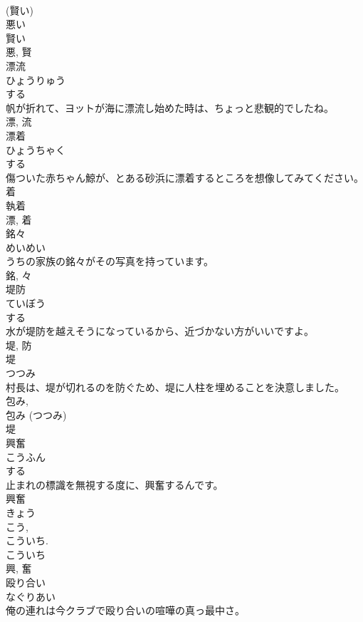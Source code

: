 \documentclass[8pt]{extreport}
\begin{document}
\begin{CJK}{UTF8}{min}
\\	(賢い) 
\\	悪い 
\\	賢い 
\\	悪, 賢	
\\	漂流	
\\	ひょうりゅう	
\\	する 
\\	帆が折れて、ヨットが海に漂流し始めた時は、ちょっと悲観的でしたね。	
\\	漂, 流	
\\	漂着	
\\	ひょうちゃく	
\\	する 
\\	傷ついた赤ちゃん鯨が、とある砂浜に漂着するところを想像してみてください。	
\\	着 
\\	執着 
\\	漂, 着	
\\	銘々	
\\	めいめい	
\\	うちの家族の銘々がその写真を持っています。	
\\	銘, 々	
\\	堤防	
\\	ていぼう	
\\	する 
\\	水が堤防を越えそうになっているから、近づかない方がいいですよ。	
\\	堤, 防	
\\	堤	
\\	つつみ	
\\	村長は、堤が切れるのを防ぐため、堤に人柱を埋めることを決意しました。	
\\	包み, 
\\	包み (つつみ) 
\\	堤	
\\	興奮	
\\	こうふん	
\\	する 
\\	止まれの標識を無視する度に、興奮するんです。	
\\	興奮 
\\	きょう 
\\	こう, 
\\	こういち. 
\\	こういち 
\\	興, 奮	
\\	殴り合い	
\\	なぐりあい	
\\	俺の連れは今クラブで殴り合いの喧嘩の真っ最中さ。	

\end{CJK}
\end{document}
